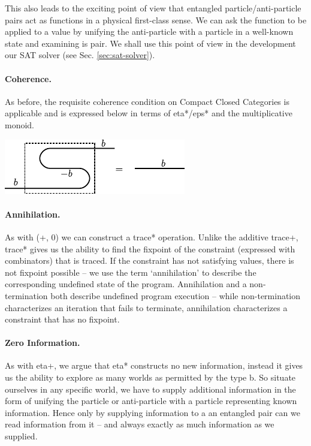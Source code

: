 \documentclass[preprint]{sigplanconf}
\begin{document}
This also leads to the exciting point of view that entangled
particle/anti-particle pairs act as functions in a physical
first-class sense. We can ask the function to be applied to a value by
unifying the anti-particle with a particle in a well-known state and
examining is pair. We shall use this point of view in the development
our SAT solver (see Sec. \ref{sec:sat-solver}).

\paragraph*{Coherence.} 
As before, the requisite coherence condition on Compact Closed
Categories is applicable and is expressed below in terms of
{{eta*}}/{{eps*}} and the multiplicative monoid.

\begin{center}
  \includegraphics{diagrams/coherence.pdf}
\end{center}

\paragraph*{Annihilation.}
As with {{(+, 0)}} we can construct a {{trace*}} operation. Unlike the
additive {{trace+}}, {{trace*}} gives us the ability to find the
fixpoint of the constraint (expressed with combinators) that is
traced. If the constraint has not satisfying values, there is not
fixpoint possible -- we use the term `annihilation' to describe the
corresponding undefined state of the program. Annihilation and a
non-termination both describe undefined program execution -- while
non-termination characterizes an iteration that fails to terminate,
annihilation characterizes a constraint that has no fixpoint. 

\paragraph*{Zero Information.}
As with {{eta+}}, we argue that {{eta*}} constructs no new
information, instead it gives us the ability to explore as many worlds
as permitted by the type {{b}}. So situate ourselves in any specific
world, we have to supply additional information in the form of
unifying the particle or anti-particle with a particle representing
known information. Hence only by supplying information to a an
entangled pair can we read information from it -- and always exactly
as much information as we supplied.
\end{document}
